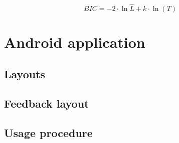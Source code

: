 \begin{equation}
\label{eq:bic}
	 BIC = -2 \cdot \ln{\hat L} + k \cdot \ln(T)
\end{equation}





\section{Android application}
\label{sec:android_app}

\subsection{Layouts}
\label{ssec:layouts}

\subsection{Feedback layout}
\label{ssec:feedback_layout}

\subsection{Usage procedure}
\label{ssec:usage_procedure}



